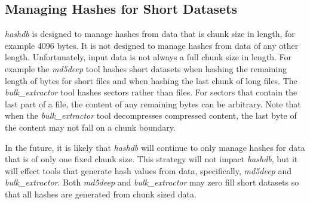 \documentclass[12pt,twoside]{article}
\newcommand{\hdb}{\emph{hashdb}\xspace}
\newcommand{\bulk}{\emph{bulk\_extractor}\xspace}
\newcommand{\mdd}{\emph{md5deep}\xspace}
\begin{document}
\subsection{Managing Hashes for Short Datasets}
\hdb is designed to manage hashes from data that is chunk size in length,
for example 4096 bytes.
It is not designed to manage hashes from data of any other length.
Unfortunately, input data is not always a full chunk size in length.
For example the \mdd tool hashes short datasets when hashing
the remaining length of bytes for short files
and when hashing the last chunk of long files.
The \bulk tool hashes sectors rather than files.
For sectors that contain the last part of a file,
the content of any remaining bytes can be arbitrary.
Note that when the \bulk tool decompresses compressed content,
the last byte of the content may not fall on a chunk boundary.

In the future, it is likely that \hdb will continue to only manage
hashes for data that is of only one fixed chunk size.
This strategy will not impact \hdb,
but it will effect tools that generate hash values from data,
specifically, \mdd and \bulk.
Both \mdd and \bulk may zero fill short datasets so that all
hashes are generated from chunk sized data.



\end{document}
